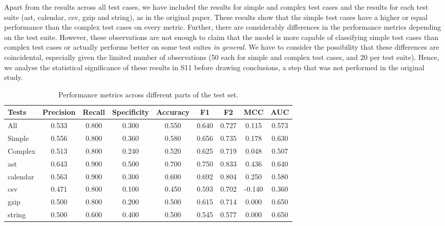 \documentclass[a4paper]{article}
\begin{document}
Apart from the results across all test cases, we have included the results for simple and complex test cases and the results for each test suite (ast, calendar, csv, gzip and string), as in the original paper. These results show that the simple test cases have a higher or equal performance than the complex test cases on every metric. Further, there are considerably differences in the performance metrics depending on the test suite. However, these observations are not enough to claim that the model is more capable of classifying simple test cases than complex test cases or actually performs better on some test suites \textit{in general}. We have to consider the possibility that these differences are coincidental, especially given the limited number of observations (50 each for simple and complex test cases, and 20 per test suite). Hence, we analyse the statistical significance of these results in S11 before drawing conclusions, a step that was not performed in the original study. 

\begin{table}[H]
	\centering
	\caption{Performance metrics across different parts of the test set.}
	\label{table:test_metrics}
	\begin{tabularx}{\textwidth}{|X|c|c|c|c|c|c|c|c|}
		\hline
		\textbf{Tests} & \textbf{Precision} & \textbf{Recall} & \textbf{Specificity} & \textbf{Accuracy} & \textbf{F1} & \textbf{F2} & \textbf{MCC} & \textbf{AUC} \\
		\hline
		All & 0.533 & 0.800 & 0.300 & 0.550 & 0.640 & 0.727 & 0.115 & 0.573 \\
		\hline
		Simple & 0.556 & 0.800 & 0.360 & 0.580 & 0.656 & 0.735 & 0.178 & 0.630 \\
		Complex & 0.513 & 0.800 & 0.240 & 0.520 & 0.625 & 0.719 & 0.048 & 0.507 \\
		\hline
		ast & 0.643 & 0.900 & 0.500 & 0.700 & 0.750 & 0.833 & 0.436 & 0.640 \\
		calendar & 0.563 & 0.900 & 0.300 & 0.600 & 0.692 & 0.804 & 0.250 & 0.580 \\
		csv & 0.471 & 0.800 & 0.100 & 0.450 & 0.593 & 0.702 & -0.140 & 0.360 \\
		gzip & 0.500 & 0.800 & 0.200 & 0.500 & 0.615 & 0.714 & 0.000 & 0.650 \\
		string & 0.500 & 0.600 & 0.400 & 0.500 & 0.545 & 0.577 & 0.000 & 0.650 \\
		\hline
	\end{tabularx}
\end{table}
\end{document}

